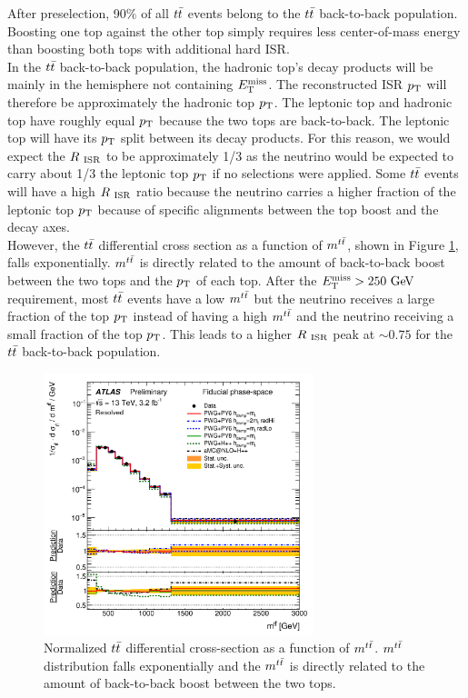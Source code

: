 \indent  After preselection, 90\% of all $\ttbar$ events belong to the $\ttbar$ back-to-back population.  Boosting one top against the other top simply requires less center-of-mass energy than boosting both tops with additional hard ISR.  \\

\indent In the $\ttbar$ back-to-back population, the hadronic top's decay products will be mainly in the hemisphere not containing $E_{\mathrm{T}}^{\mathrm{miss}}$.  The reconstructed ISR $p_{\mathrm{T}}$ will therefore be approximately the hadronic top $p_{\mathrm{T}}$.  The leptonic top and hadronic top have roughly equal $p_{\mathrm{T}}$ because the two tops are back-to-back.  The leptonic top will have its $p_{\mathrm{T}}$ split between its decay products.  For this reason, we would expect the $R_{~\mathrm{ISR}}$ to be approximately 1/3 as the neutrino would be expected to carry about 1/3 the leptonic top $p_{\mathrm{T}}$ if no selections were applied. Some $\ttbar$ events will have a high $R_{~\mathrm{ISR}}$ ratio because the neutrino carries a higher fraction of the leptonic top $p_{\mathrm{T}}$ because of specific alignments between the top boost and the decay axes. \\

\indent However, the $\ttbar$ differential cross section as a function of $m^{t\tbar}$, shown in Figure \ref{fig:ttbar:mtt}, falls exponentially.  $m^{t\tbar}$ is directly related to the amount of back-to-back boost between the two tops and the $p_{\mathrm{T}}$ of each top.  After the $\met > 250 \gev$ requirement, most $\ttbar$ events have a low $m^{t\tbar}$ but the neutrino receives a large fraction of the top $p_{\mathrm{T}}$ instead of having a high $m^{t\tbar}$ and the neutrino receiving a small fraction of the top $p_{\mathrm{T}}$.  This leads to a higher $R_{~\mathrm{ISR}}$ peak at $\sim0.75$ for the $\ttbar$ back-to-back population. \\

\begin{figure}[h!]
  \centering
	\includegraphics[width=0.70\textwidth]{./figures/strategy/ttbar_mtt.png}
	\caption[Normalized $\ttbar$ differential cross section as a function of $m^{t\tbar}$]{Normalized $\ttbar$ differential cross-section as a function of $m^{t\tbar}$.  $m^{t\tbar}$ distribution falls exponentially and the $m^{t\tbar}$ is directly related to the amount of back-to-back boost between the two tops. \cite{ttbarDiffCross} }
\label{fig:ttbar:mtt}
\end{figure}

